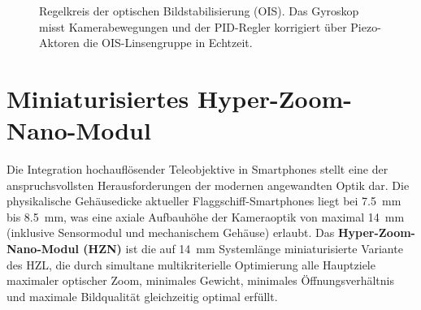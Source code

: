 ﻿\documentclass[12pt,a4paper]{article}
\theoremstyle{definition}
\begin{document}
	\begin{figure}[H]
		\centering
		\caption{Regelkreis der optischen Bildstabilisierung (OIS). Das Gyroskop
			misst Kamerabewegungen und der PID-Regler korrigiert über Piezo-Aktoren
			die OIS-Linsengruppe in Echtzeit.}
		\label{fig:ois}
	\end{figure}
	
	\section{Miniaturisiertes Hyper-Zoom-Nano-Modul}

	Die Integration hochaufl\"osender Teleobjektive in Smartphones stellt eine
	der anspruchsvollsten Herausforderungen der modernen angewandten Optik dar.
	Die physikalische Geh\"ausedicke aktueller Flaggschiff-Smartphones liegt bei
	\SI{7.5}{\milli\metre} bis \SI{8.5}{\milli\metre}, was eine axiale Aufbauh\"ohe
	der Kameraoptik von maximal \SI{14}{\milli\metre} (inklusive Sensormodul und
	mechanischem Geh\"ause) erlaubt. Das \textbf{Hyper-Zoom-Nano-Modul (HZN)} ist
	die auf \SI{14}{\milli\metre} Systeml\"ange miniaturisierte Variante des HZL,
	die durch simultane multikriterielle Optimierung alle Hauptziele \textemdash
	maximaler optischer Zoom, minimales Gewicht, minimales \"Offnungsverh\"altnis
	und maximale Bildqualit\"at \textemdash gleich\-zeitig optimal erf\"ullt.
\end{document}
